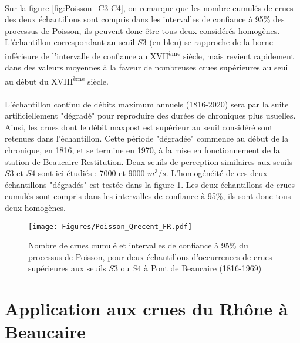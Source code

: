 \documentclass[11pt]{article}
\begin{document}
	\paragraph{} Sur la figure \ref{fig:Poisson_C3-C4}, on remarque que les nombre cumulés de crues des deux échantillons sont compris dans les intervalles de confiance à 95\% des processus de Poisson, ils peuvent donc être tous deux considérés homogènes. L'échantillon correspondant au seuil $S3$ (en bleu) se rapproche de la borne inférieure de l'intervalle de confiance au XVII\textsuperscript{ème} siècle, mais revient rapidement dans des valeurs moyennes à la faveur de nombreuses crues supérieures au seuil au début du XVIII\textsuperscript{ème} siècle. 
	
	\paragraph{} L'échantillon continu de débits maximum annuels (1816-2020) sera par la suite artificiellement "dégradé" pour reproduire des durées de chroniques plus usuelles. Ainsi, les crues dont le débit maxpost est supérieur au seuil considéré sont retenues dans l'échantillon. Cette période "dégradée" commence au début de la chronique, en 1816, et se termine en 1970, à la mise en fonctionnement de la station de Beaucaire Restitution. Deux seuils de perception similaires aux seuils $S3$ et $S4$ sont ici étudiés : 7000 et 9000 $m^3/s$. L'homogénéité de ces deux échantillons "dégradés" est testée dans la figure \ref{fig:Poisson_Recent}. Les deux échantillons de crues cumulés sont compris dans les intervalles de confiance à 95\%, ils sont donc tous deux homogènes. 
	
	\begin{figure}[h]
		\centering
		\texttt{[image: Figures/Poisson\_Qrecent\_FR.pdf]}	
		\caption{Nombre de crues cumulé et intervalles de confiance à 95\% du processus de 						Poisson, pour deux échantillons d'occurrences de crues supérieures aux seuils $S3$ ou $S4$ à Pont de Beaucaire 							(1816-1969) }
		\label{fig:Poisson_Recent}
	\end{figure}
	
	
		
\FloatBarrier		
	
	
\section{Application aux crues du Rhône à Beaucaire}
\label{sec:applicationBcr}
\end{document}
